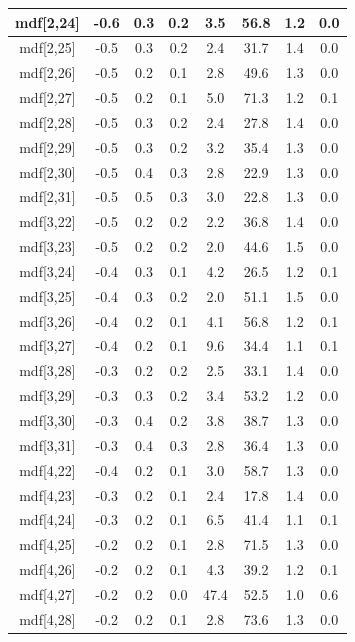 \begin{longtable}{|c|c|c|c|c|c|c|c|}
\hline
mdf[2,24] & -0.6 & 0.3 & 0.2 & 3.5 & 56.8 & 1.2 & 0.0 \\
\hline
mdf[2,25] & -0.5 & 0.3 & 0.2 & 2.4 & 31.7 & 1.4 & 0.0 \\
\hline
mdf[2,26] & -0.5 & 0.2 & 0.1 & 2.8 & 49.6 & 1.3 & 0.0 \\
\hline
mdf[2,27] & -0.5 & 0.2 & 0.1 & 5.0 & 71.3 & 1.2 & 0.1 \\
\hline
mdf[2,28] & -0.5 & 0.3 & 0.2 & 2.4 & 27.8 & 1.4 & 0.0 \\
\hline
mdf[2,29] & -0.5 & 0.3 & 0.2 & 3.2 & 35.4 & 1.3 & 0.0 \\
\hline
mdf[2,30] & -0.5 & 0.4 & 0.3 & 2.8 & 22.9 & 1.3 & 0.0 \\
\hline
mdf[2,31] & -0.5 & 0.5 & 0.3 & 3.0 & 22.8 & 1.3 & 0.0 \\
\hline
mdf[3,22] & -0.5 & 0.2 & 0.2 & 2.2 & 36.8 & 1.4 & 0.0 \\
\hline
mdf[3,23] & -0.5 & 0.2 & 0.2 & 2.0 & 44.6 & 1.5 & 0.0 \\
\hline
mdf[3,24] & -0.4 & 0.3 & 0.1 & 4.2 & 26.5 & 1.2 & 0.1 \\
\hline
mdf[3,25] & -0.4 & 0.3 & 0.2 & 2.0 & 51.1 & 1.5 & 0.0 \\
\hline
mdf[3,26] & -0.4 & 0.2 & 0.1 & 4.1 & 56.8 & 1.2 & 0.1 \\
\hline
mdf[3,27] & -0.4 & 0.2 & 0.1 & 9.6 & 34.4 & 1.1 & 0.1 \\
\hline
mdf[3,28] & -0.3 & 0.2 & 0.2 & 2.5 & 33.1 & 1.4 & 0.0 \\
\hline
mdf[3,29] & -0.3 & 0.3 & 0.2 & 3.4 & 53.2 & 1.2 & 0.0 \\
\hline
mdf[3,30] & -0.3 & 0.4 & 0.2 & 3.8 & 38.7 & 1.3 & 0.0 \\
\hline
mdf[3,31] & -0.3 & 0.4 & 0.3 & 2.8 & 36.4 & 1.3 & 0.0 \\
\hline
mdf[4,22] & -0.4 & 0.2 & 0.1 & 3.0 & 58.7 & 1.3 & 0.0 \\
\hline
mdf[4,23] & -0.3 & 0.2 & 0.1 & 2.4 & 17.8 & 1.4 & 0.0 \\
\hline
mdf[4,24] & -0.3 & 0.2 & 0.1 & 6.5 & 41.4 & 1.1 & 0.1 \\
\hline
mdf[4,25] & -0.2 & 0.2 & 0.1 & 2.8 & 71.5 & 1.3 & 0.0 \\
\hline
mdf[4,26] & -0.2 & 0.2 & 0.1 & 4.3 & 39.2 & 1.2 & 0.1 \\
\hline
mdf[4,27] & -0.2 & 0.2 & 0.0 & 47.4 & 52.5 & 1.0 & 0.6 \\
\hline
mdf[4,28] & -0.2 & 0.2 & 0.1 & 2.8 & 73.6 & 1.3 & 0.0 \\

\end{longtable}

